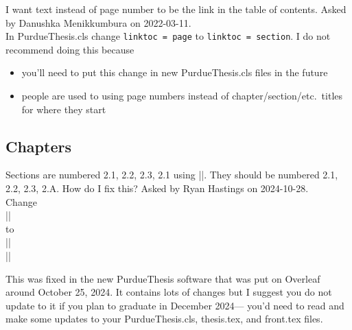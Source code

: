 I want text instead of page number to be the link
in the table of contents.
Asked by Danushka Menikkumbura on 2022-03-11.\\
\MyA
In PurdueThesis.cls change \verb+linktoc = page+
to \verb+linktoc = section+.
I do not recommend doing this because
\begin{itemize}
  \item
    you'll need to put this change
    in new PurdueThesis.cls files in the future
  \item
    people are used to using page numbers instead
    of chapter/section/etc.~titles for where they
    start
\end{itemize}


\subsection*{Chapters}
Sections are numbered 2.1, 2.2, 2.3, 2.1 using |\chapterappendix|.
They should be numbered 2.1, 2.2, 2.3, 2.A.
How do I fix this?
Asked by Ryan Hastings on 2024-10-28.\\
\MyA                                                                                    
Change\\
|\chapterappendix|\\
to\\
|\chapterappendix|\\
|\renewcommand{\thesection}{\thechapter.\AlphAlph{\value{section}}}|
                                                                                    
This was fixed in the new PurdueThesis software
that was put on Overleaf
around October 25, 2024.
It contains lots of changes
but I suggest you do not update to it
if you plan to graduate in December 2024---%
you'd need to read and make some updates to your
PurdueThesis.cls, thesis.tex, and front.tex files.                                  


